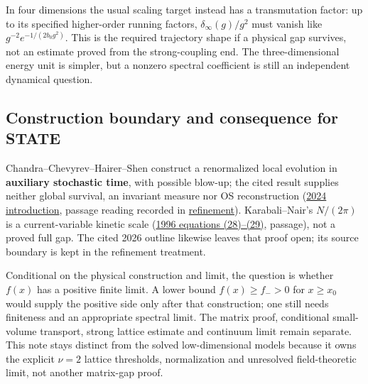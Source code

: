 \documentclass[11pt,a4paper]{article}
\begin{document}
In four dimensions the usual scaling target instead has a transmutation
factor: up to its specified higher-order running factors,
\(\delta_\infty(g)/g^2\) must vanish like \(g^{-2}e^{-1/(2b_0g^2)}\).
This is the required trajectory shape if a physical gap survives, not an
estimate proved from the strong-coupling end. The three-dimensional
energy unit is simpler, but a nonzero spectral coefficient is still an
independent dynamical question.

\hypertarget{construction-boundary-and-consequence-for-state}{%
\subsection{Construction boundary and consequence for
STATE}\label{construction-boundary-and-consequence-for-state}}

Chandra--Chevyrev--Hairer--Shen construct a renormalized local evolution
in \textbf{auxiliary stochastic time}, with possible blow-up; the cited
result supplies neither global survival, an invariant measure nor OS
reconstruction (\href{https://arxiv.org/pdf/2201.03487}{2024
introduction}, passage reading recorded in
\href{refinement-composition-and-limit.md}{refinement}).
Karabali--Nair's \(N/(2\pi)\) is a current-variable kinetic scale
(\href{https://arxiv.org/pdf/hep-th/9602155}{1996 equations (28)--(29)},
passage), not a proved full gap. The cited 2026 outline likewise leaves
that proof open; its source boundary is kept in the refinement
treatment.

Conditional on the physical construction and limit, the question is
whether \(f(x)\) has a positive finite limit. A lower bound
\(f(x)\ge f_->0\) for \(x\ge x_0\) would supply the positive side only
after that construction; one still needs finiteness and an appropriate
spectral limit. The matrix proof, conditional small-volume transport,
strong lattice estimate and continuum limit remain separate. This note
stays distinct from the solved low-dimensional models because it owns
the explicit \(\nu=2\) lattice thresholds, normalization and unresolved
field-theoretic limit, not another matrix-gap proof.
\end{document}
